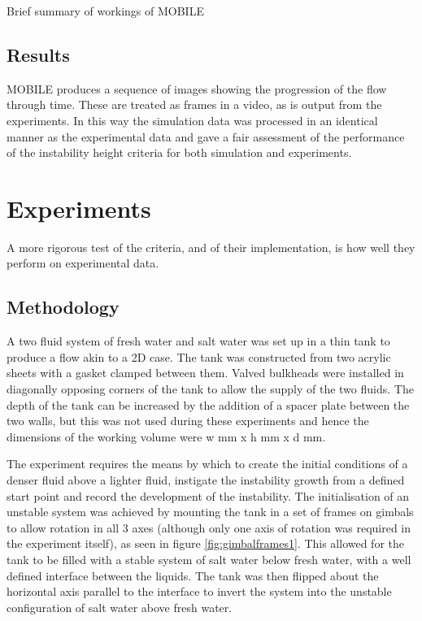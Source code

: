 \documentclass[11pt]{article}
\begin{document}
Brief summary of workings of MOBILE

\subsection*{Results}

MOBILE produces a sequence of images showing the progression of the flow through time. These are treated as frames in a video, as is output from the experiments. In this way the simulation data was processed in an identical manner as the experimental data and gave a fair assessment of the performance of the instability height criteria for both simulation and experiments.

\section*{Experiments}

A more rigorous test of the criteria, and of their implementation, is how well they perform on experimental data.

\subsection*{Methodology}

A two fluid system of fresh water and salt water was set up in a thin tank to produce a flow akin to a 2D case. The tank was constructed from two acrylic sheets with a gasket clamped between them. Valved bulkheads were installed in diagonally opposing corners of the tank to allow the supply of the two fluids. The depth of the tank can be increased by the addition of a spacer plate between the two walls, but this was not used during these experiments and hence the dimensions of the working volume were w mm x h mm x d mm.

The experiment requires the means by which to create the initial conditions of a denser fluid above a lighter fluid, instigate the instability growth from a defined start point and record the development of the instability. The initialisation of an unstable system was achieved by mounting the tank in a set of frames on gimbals to allow rotation in all 3 axes (although only one axis of rotation was required in the experiment itself), as seen in figure \ref{fig:gimbalframes1}. This allowed for the tank to be filled with a stable system of salt water below fresh water, with a well defined interface between the liquids. The tank was then flipped about the horizontal axis parallel to the interface to invert the system into the unstable configuration of salt water above fresh water.
\end{document}
